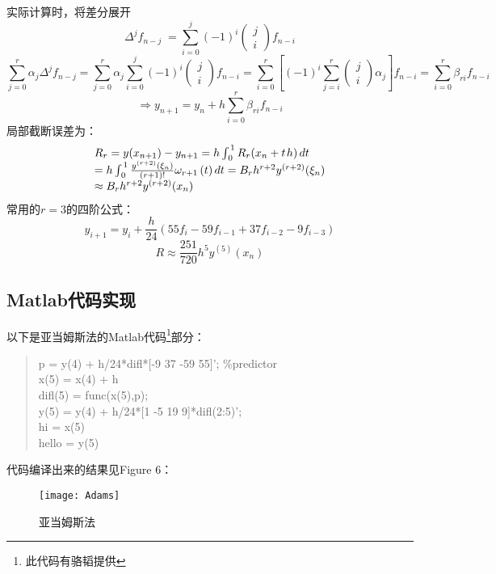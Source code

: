 \documentclass[a4paper,12pt]{article}
\begin{document}
实际计算时，将差分展开
\[
{\Delta ^j}{f_{n - j}}\; = \sum\limits_{i = 0}^j {{{\left( { - 1} \right)}^i}} \left( {\begin{array}{*{20}{c}}
j\\
i
\end{array}} \right){f_{n - i}}\]
\[\sum\limits_{j = 0}^r {{\alpha _j}} {\Delta ^j}{f_{n - j}} = \sum\limits_{j = 0}^r {{\alpha _j}} \sum\limits_{i = 0}^j {{{\left( { - 1} \right)}^i}} \left( {\begin{array}{*{20}{c}}
j\\
i
\end{array}} \right){f_{n - i}} = \sum\limits_{i = 0}^r {\left[ {{{\left( { - 1} \right)}^i}\sum\limits_{j = i}^r {\left( {\begin{array}{*{20}{c}}
j\\
i
\end{array}} \right){\alpha _j}} } \right]} {f_{n - i}} = \sum\limits_{i = 0}^r {{\beta _{ri}}} {f_{n - i}}
\]
\[ \Rightarrow {y_{n + 1}} = {y_n} + h\sum\limits_{i = 0}^r {{\beta _{ri}}} {f_{n - i}}\]
局部截断误差为：
\[\begin{array}{l}
{R_r} = y({x_{n + 1}}) - {y_{n + 1}} = h\int_{{\kern 1pt} 0}^{{\kern 1pt} 1} {{R_r}({x_n} + t{\kern 1pt} h)\,dt} \\
 = h\int_{{\kern 1pt} 0}^{{\kern 1pt} 1} {\frac{{{y^{(r + 2)}}\left( {{\xi _n}} \right)}}{{\left( {r + 1} \right)!}}{\omega _{r + 1}}\left( t \right)dt}  = {B_r}{h^{r + 2}}{y^{(r + 2)}}({\xi _n})\\
 \approx {B_r}{h^{r + 2}}{y^{(r + 2)}}({x_n})
\end{array}\]
常用的$r=3$的四阶公式：
\begin{equation}
{y_{i + 1}} = {y_i} + \frac{h}{{24}}(55{f_i} - 59{f_{i - 1}} + 37{f_{i - 2}} - 9{f_{i - 3}})
\end{equation}
\[R \approx \frac{{251}}{{720}}{h^5}{y^{(5)}}({x_n})\]

\subsection{Matlab代码实现}
以下是亚当姆斯法的Matlab代码\footnote{此代码有骆韬提供}部分：
\begin{quote}
\small{
p =  y(4) + h/24*difl*[-9 37 -59 55]'; \%predictor\\
x(5) = x(4) + h\\
difl(5) = func(x(5),p);\\
y(5) = y(4) + h/24*[1 -5 19 9]*difl(2:5)';\\
hi = x(5)\\
hello = y(5)\\
}
\end{quote}
代码编译出来的结果见Figure 6：
\begin{figure}
  \centering
  \texttt{[image: Adams]}\\
  \caption{亚当姆斯法}
\end{figure}
\end{document}
